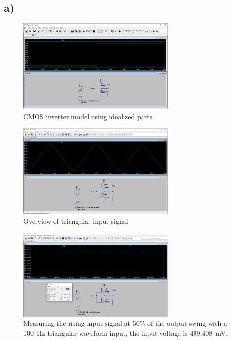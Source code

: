 \documentclass{article}
\begin{document}
	\subsection*{a)}
	
	\begin{figure}[H]
	    \centering
	    \includegraphics[width=0.7\textwidth]{1a-1-1-sim}
	    \caption{CMOS inverter model using idealized parts}
	\end{figure}

	\begin{figure}[H]
	    \centering
	    \includegraphics[width=0.7\textwidth]{1a-2-1-sim}
	    \caption{Overview of triangular input signal}
	\end{figure}
	
	\begin{figure}[H]
	    \centering
	    \includegraphics[width=0.7\textwidth]{1a-2-2-sim}
	    \caption[Measuring the rising input signal]{Measuring the rising input signal at 50\% of the output swing with a \SI{100}{Hz} triangular waveform input, the input voltage is \SI{499.408}{mV}.}
	\end{figure}
	
\end{document}
